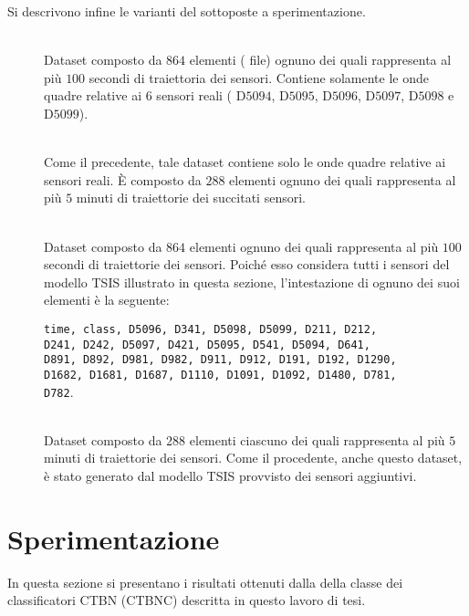 Si descrivono infine le varianti del  sottoposte a sperimentazione.
\begin{description}
	\item[] \hfill \\
	Dataset composto da $864$ elementi (\ie{} file) ognuno dei quali rappresenta al più $100$ secondi di traiettoria dei sensori. Contiene solamente le onde quadre relative ai $6$ sensori reali (\ie{} D$5094$, D$5095$, D$5096$, D$5097$, D$5098$ e D$5099$).
	\item[] \hfill \\
	Come il precedente, tale dataset contiene solo le onde quadre relative ai sensori reali. \`E composto da $288$ elementi ognuno dei quali rappresenta al più $5$ minuti di traiettorie dei succitati sensori.
	\item[] \hfill \\
	Dataset composto da $864$ elementi ognuno dei quali rappresenta al più $100$ secondi di traiettorie dei sensori. Poiché esso considera tutti i sensori del modello \acs{TSIS} illustrato in questa sezione, l'intestazione di ognuno dei suoi elementi è la seguente:\par
	\lstinline[]|time, class, D5096, D341, D5098, D5099, D211, D212, |\\\lstinline[]|D241, D242, D5097, D421, D5095, D541, D5094, D641, |\\\lstinline[]|D891, D892, D981, D982, D911, D912, D191, D192, D1290, |\\\lstinline[]|D1682, D1681, D1687, D1110, D1091, D1092, D1480, D781, |\\\lstinline[]|D782|.
	\item[] \hfill \\
	Dataset composto da $288$ elementi ciascuno dei quali rappresenta al più $5$ minuti di traiettorie dei sensori. Come il procedente, anche questo dataset, è stato generato dal modello \acs{TSIS} provvisto dei sensori aggiuntivi.
\end{description}

\cleardoublepage
\section{Sperimentazione}
In questa sezione si presentano i risultati ottenuti dalla  della classe dei classificatori \acs{CTBN} (\acs{CTBNC}) descritta in questo lavoro di tesi.

